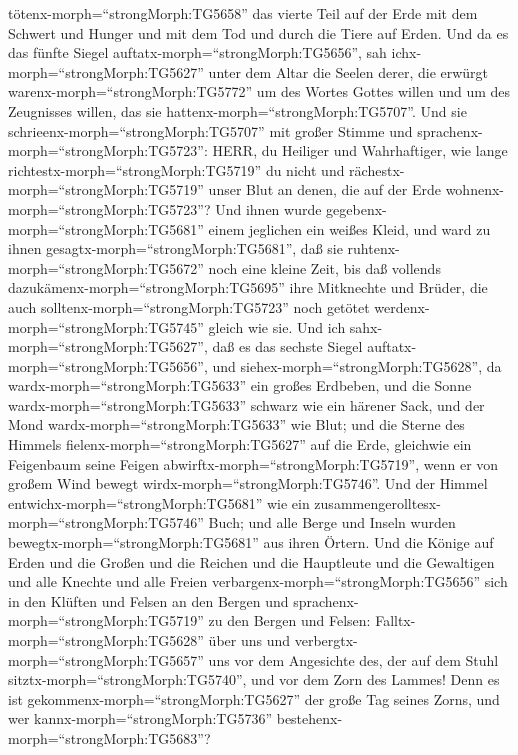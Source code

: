tötenx-morph=``strongMorph:TG5658'' das vierte Teil auf der Erde mit dem
Schwert und Hunger und mit dem Tod und durch die Tiere auf Erden.
 Und da es das fünfte Siegel
auftatx-morph=``strongMorph:TG5656'', sah
ichx-morph=``strongMorph:TG5627'' unter dem Altar die Seelen derer, die
erwürgt warenx-morph=``strongMorph:TG5772'' um des Wortes Gottes willen
und um des Zeugnisses willen, das sie
hattenx-morph=``strongMorph:TG5707''.  Und sie
schrieenx-morph=``strongMorph:TG5707'' mit großer Stimme und
sprachenx-morph=``strongMorph:TG5723'': HERR, du Heiliger und
Wahrhaftiger, wie lange richtestx-morph=``strongMorph:TG5719'' du nicht
und rächestx-morph=``strongMorph:TG5719'' unser Blut an denen, die auf
der Erde wohnenx-morph=``strongMorph:TG5723''?  Und ihnen
wurde gegebenx-morph=``strongMorph:TG5681'' einem jeglichen ein weißes
Kleid, und ward zu ihnen gesagtx-morph=``strongMorph:TG5681'', daß sie
ruhtenx-morph=``strongMorph:TG5672'' noch eine kleine Zeit, bis daß
vollends dazukämenx-morph=``strongMorph:TG5695'' ihre Mitknechte und
Brüder, die auch solltenx-morph=``strongMorph:TG5723'' noch getötet
werdenx-morph=``strongMorph:TG5745'' gleich wie sie.  Und
ich sahx-morph=``strongMorph:TG5627'', daß es das sechste Siegel
auftatx-morph=``strongMorph:TG5656'', und
siehex-morph=``strongMorph:TG5628'', da
wardx-morph=``strongMorph:TG5633'' ein großes Erdbeben, und die Sonne
wardx-morph=``strongMorph:TG5633'' schwarz wie ein härener Sack, und der
Mond wardx-morph=``strongMorph:TG5633'' wie Blut;  und die
Sterne des Himmels fielenx-morph=``strongMorph:TG5627'' auf die Erde,
gleichwie ein Feigenbaum seine Feigen
abwirftx-morph=``strongMorph:TG5719'', wenn er von großem Wind bewegt
wirdx-morph=``strongMorph:TG5746''.  Und der Himmel
entwichx-morph=``strongMorph:TG5681'' wie ein
zusammengerolltesx-morph=``strongMorph:TG5746'' Buch; und alle Berge und
Inseln wurden bewegtx-morph=``strongMorph:TG5681'' aus ihren Örtern.
 Und die Könige auf Erden und die Großen und die Reichen
und die Hauptleute und die Gewaltigen und alle Knechte und alle Freien
verbargenx-morph=``strongMorph:TG5656'' sich in den Klüften und Felsen
an den Bergen  und sprachenx-morph=``strongMorph:TG5719''
zu den Bergen und Felsen: Falltx-morph=``strongMorph:TG5628'' über uns
und verbergtx-morph=``strongMorph:TG5657'' uns vor dem Angesichte des,
der auf dem Stuhl sitztx-morph=``strongMorph:TG5740'', und vor dem Zorn
des Lammes!  Denn es ist
gekommenx-morph=``strongMorph:TG5627'' der große Tag seines Zorns, und
wer kannx-morph=``strongMorph:TG5736''
bestehenx-morph=``strongMorph:TG5683''?

